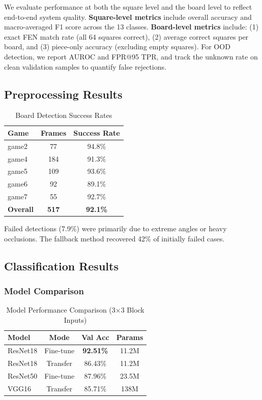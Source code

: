 \documentclass[conference]{IEEEtran}
\begin{document}
We evaluate performance at both the square level and the board level to reflect end-to-end system quality.
\textbf{Square-level metrics} include overall accuracy and macro-averaged F1 score across the 13 classes.
\textbf{Board-level metrics} include: (1) exact FEN match rate (all 64 squares correct), (2) average correct squares per board, and (3) piece-only accuracy (excluding empty squares).
For OOD detection, we report AUROC and FPR@95 TPR, and track the unknown rate on clean validation samples to quantify false rejections.

\subsection{Preprocessing Results}

\begin{table}[h]
\centering
\caption{Board Detection Success Rates}
\begin{tabular}{lcc}
\toprule
\textbf{Game} & \textbf{Frames} & \textbf{Success Rate} \\
\midrule
game2 & 77 & 94.8\% \\
game4 & 184 & 91.3\% \\
game5 & 109 & 93.6\% \\
game6 & 92 & 89.1\% \\
game7 & 55 & 92.7\% \\
\midrule
\textbf{Overall} & \textbf{517} & \textbf{92.1\%} \\
\bottomrule
\end{tabular}
\end{table}

Failed detections (7.9\%) were primarily due to extreme angles or heavy occlusions. The fallback method recovered 42\% of initially failed cases.

\subsection{Classification Results}

\subsubsection{Model Comparison}

\begin{table}[h]
\centering
\caption{Model Performance Comparison (3×3 Block Inputs)}
\begin{tabular}{lccc}
\toprule
\textbf{Model} & \textbf{Mode} & \textbf{Val Acc} & \textbf{Params} \\
\midrule
ResNet18 & Fine-tune & \textbf{92.51\%} & 11.2M \\
ResNet18 & Transfer & 86.43\% & 11.2M \\
ResNet50 & Fine-tune & 87.96\% & 23.5M \\
VGG16 & Transfer & 85.71\% & 138M \\
\bottomrule
\end{tabular}
\end{table}
\end{document}
